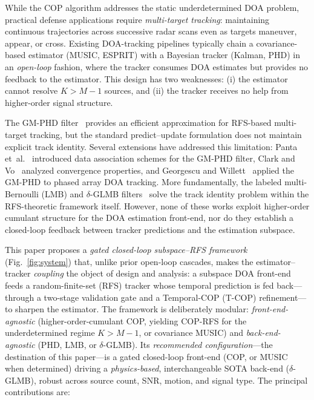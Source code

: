 \documentclass[journal]{IEEEtran}
\begin{document}
While the COP algorithm addresses the static underdetermined DOA problem, practical defense applications require \emph{multi-target tracking}: maintaining continuous trajectories across successive radar scans even as targets maneuver, appear, or cross. Existing DOA-tracking pipelines typically chain a covariance-based estimator (MUSIC, ESPRIT) with a Bayesian tracker (Kalman, PHD) in an \emph{open-loop} fashion, where the tracker consumes DOA estimates but provides no feedback to the estimator. This design has two weaknesses: (i) the estimator cannot resolve $K > M-1$ sources, and (ii) the tracker receives no help from higher-order signal structure.

The GM-PHD filter~\cite{vo2006gmphd} provides an efficient approximation for RFS-based multi-target tracking, but the standard predict--update formulation does not maintain explicit track identity. Several extensions have addressed this limitation: Panta et~al.~\cite{panta2009gmphd} introduced data association schemes for the GM-PHD filter, Clark and Vo~\cite{clark2006gmphd_track} analyzed convergence properties, and Georgescu and Willett~\cite{georgescu2012phd_doa} applied the GM-PHD to phased array DOA tracking. More fundamentally, the labeled multi-Bernoulli (LMB) and $\delta$-GLMB filters~\cite{vo2013glmb,vo2014lmb} solve the track identity problem within the RFS-theoretic framework itself. However, none of these works exploit higher-order cumulant structure for the DOA estimation front-end, nor do they establish a closed-loop feedback between tracker predictions and the estimation subspace.

This paper proposes a \emph{gated closed-loop subspace--RFS framework}
(Fig.~\ref{fig:system}) that, unlike prior open-loop cascades, makes the
estimator--tracker \emph{coupling} the object of design and analysis: a subspace
DOA front-end feeds a random-finite-set (RFS) tracker whose temporal prediction is
fed back---through a two-stage validation gate and a Temporal-COP (T-COP)
refinement---to sharpen the estimator. The framework is deliberately modular:
\emph{front-end-agnostic} (higher-order-cumulant COP, yielding COP-RFS for the
underdetermined regime $K>M{-}1$, or covariance MUSIC) and
\emph{back-end-agnostic} (PHD, LMB, or $\delta$-GLMB). Its \emph{recommended
configuration}---the destination of this paper---is a gated closed-loop front-end
(COP, or MUSIC when determined) driving a \emph{physics-based}, interchangeable
SOTA back-end ($\delta$-GLMB), robust across source count, SNR, motion, and
signal type. The principal contributions are:
\end{document}
